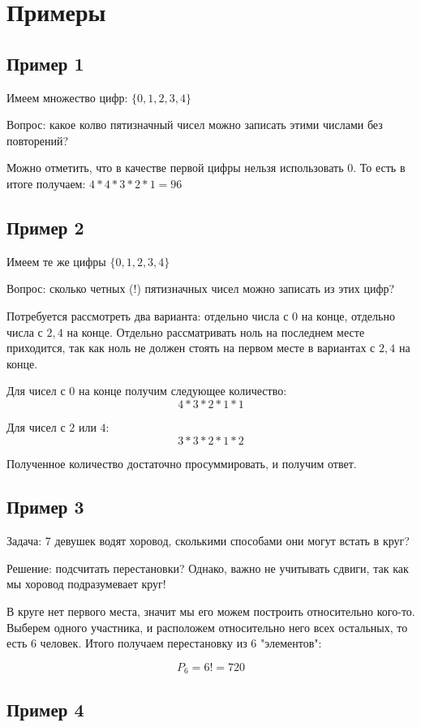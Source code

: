 \documentclass{article}
\begin{document}
\section{Примеры}
\subsection{Пример 1}

Имеем множество цифр: $\{0, 1, 2, 3, 4\}$

Вопрос: какое колво пятизначный чисел можно записать этими числами без повторений?

Можно отметить, что в качестве первой цифры нельзя использовать $0$.
То есть в итоге получаем: $4 * 4 * 3 * 2 * 1 = 96$

\subsection{Пример 2}

Имеем те же цифры $\{0, 1, 2, 3, 4\}$

Вопрос: сколько четных (!) пятизначных чисел можно записать из этих цифр?

Потребуется рассмотреть два варианта: отдельно числа с $0$ на конце, отдельно числа с $2, 4$ на конце. Отдельно рассматривать ноль на последнем месте приходится, так как ноль не должен стоять на первом месте в вариантах с $2, 4$ на конце.

Для чисел с $0$ на конце получим следующее количество:
$$4 * 3 * 2 * 1 * 1$$

Для чисел с $2$ или $4$:
$$3 * 3 * 2 * 1 * 2$$

Полученное количество достаточно просуммировать, и получим ответ.

\subsection{Пример 3}

Задача: 7 девушек водят хоровод, сколькими способами они могут встать в круг?

Решение: подсчитать перестановки? Однако, важно не учитывать сдвиги, так как мы хоровод подразумевает круг!

В круге нет первого места, значит мы его можем построить относительно кого-то. Выберем одного участника, и расположем относительно него всех остальных, то есть 6 человек. Итого получаем перестановку из 6 "элементов": 

$$P_6 = 6! = 720$$

\subsection{Пример 4}
\end{document}
